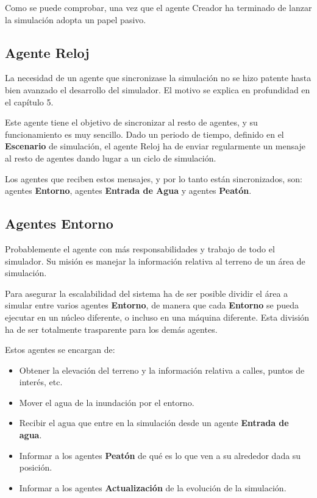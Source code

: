 Como se puede comprobar, una vez que el agente Creador ha terminado de lanzar
la simulación adopta un papel pasivo.

\subsection*{Agente Reloj}

La necesidad de un agente que sincronizase la simulación no se hizo patente
hasta bien avanzado el desarrollo del simulador. El motivo se explica en
profundidad en el capítulo 5. %

Este agente tiene el objetivo de sincronizar al resto de agentes, y su
funcionamiento es muy sencillo. Dado un periodo de tiempo, definido en el
{\bf Escenario} de simulación, el agente Reloj ha de enviar regularmente un
mensaje al resto de agentes dando lugar a un ciclo de simulación.

Los agentes que reciben estos mensajes, y por lo tanto están sincronizados,
son: agentes {\bf Entorno}, agentes {\bf Entrada de Agua} y agentes {\bf
Peatón}.

\subsection*{Agentes Entorno}

Probablemente el agente con más responsabilidades y trabajo de todo el
simulador. Su misión es manejar la información relativa al terreno de un área
de simulación.

Para asegurar la escalabilidad del sistema ha de ser posible dividir el área a
simular entre varios agentes {\bf Entorno}, de manera que cada {\bf Entorno} se
pueda ejecutar en un núcleo diferente, o incluso en una máquina diferente. Esta
división ha de ser totalmente trasparente para los demás agentes.

Estos agentes se encargan de:

\begin{itemize}
 \item Obtener la elevación del terreno y la información relativa a calles,
puntos de interés, etc.
 \item Mover el agua de la inundación por el entorno.
 \item Recibir el agua que entre en la simulación desde un agente {\bf Entrada
de agua}.
 \item Informar a los agentes {\bf Peatón} de qué es lo que ven a su alrededor
dada su posición.
 \item Informar a los agentes {\bf Actualización} de la evolución de la
simulación.
\end{itemize}

